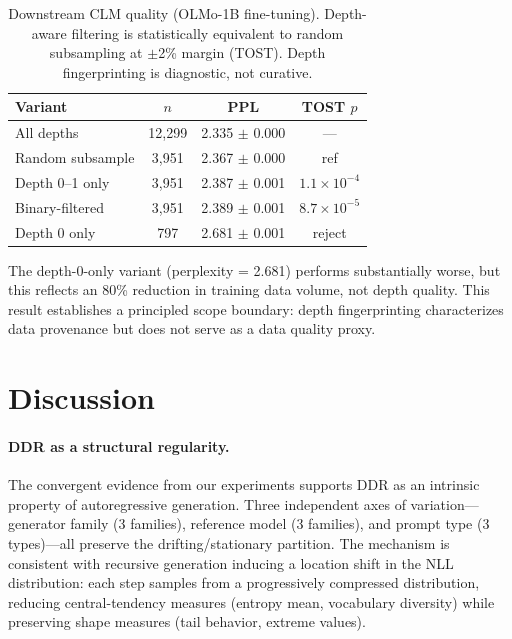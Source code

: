 \documentclass[11pt]{article}
\begin{document}
\begin{table}[t]
\centering
\small
\begin{tabular}{lccc}
\toprule
\textbf{Variant} & \textbf{$n$} & \textbf{PPL} & \textbf{TOST $p$} \\
\midrule
All depths & 12,299 & 2.335 $\pm$ 0.000 & --- \\
Random subsample & 3,951 & 2.367 $\pm$ 0.000 & ref \\
Depth 0--1 only & 3,951 & 2.387 $\pm$ 0.001 & $1.1 \times 10^{-4}$ \\
Binary-filtered & 3,951 & 2.389 $\pm$ 0.001 & $8.7 \times 10^{-5}$ \\
Depth 0 only & 797 & 2.681 $\pm$ 0.001 & reject \\
\bottomrule
\end{tabular}
\caption{Downstream CLM quality (OLMo-1B fine-tuning). Depth-aware filtering is statistically equivalent to random subsampling at $\pm$2\% margin (TOST). Depth fingerprinting is diagnostic, not curative.}
\label{tab:downstream}
\end{table}

The depth-0-only variant (perplexity = 2.681) performs substantially worse, but this reflects an 80\% reduction in training data volume, not depth quality. This result establishes a principled scope boundary: depth fingerprinting characterizes data provenance but does not serve as a data quality proxy.

\section{Discussion}
\label{sec:discussion}

\paragraph{DDR as a structural regularity.}
The convergent evidence from our experiments supports DDR as an intrinsic property of autoregressive generation. Three independent axes of variation---generator family (3 families), reference model (3 families), and prompt type (3 types)---all preserve the drifting/stationary partition. The mechanism is consistent with recursive generation inducing a location shift in the NLL distribution: each step samples from a progressively compressed distribution, reducing central-tendency measures (entropy mean, vocabulary diversity) while preserving shape measures (tail behavior, extreme values).
\end{document}
